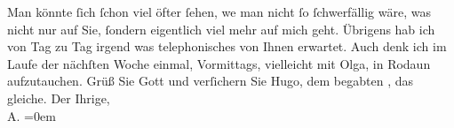 \begin{ledgroupsized}[t]{13cm}
           \pstart
           Man könnte ſich ſchon viel öfter ſehen, we{\geminationn} man nicht ſo
               ſchwerfällig wäre, was nicht {\pb}nur auf Sie, ſondern
               eigentlich viel mehr auf mich geht. Übrigens hab ich von Tag zu Tag irgend was
               telephonisches von Ihnen erwartet. Auch denk ich im Laufe der nächſten Woche einmal,
                  Vormittags, vielleicht mit Olga,
               in Rodaun aufzutauchen.\pend
           \pstart
           Grüß Sie Gott und verſichern {\pb}Sie Hugo, dem begabten \label{K_L01280_2v}\label{K_L01280_2h}, das gleiche.\pend
           \pstart
           Der Ihrige,{\\[\baselineskip]}\spacefill\mbox{A.}\pend
           \leftskip=0em{}
         
         \endnumbering{}\end{ledgroupsized}  \newcommand{\dateiname}{L01280}\newcommand{\titel}{Arthur Schnitzler an Richard Beer-Hofmann, 27. 3. 1903}\newcommand{\editorInnen}{Martin Anton Müller und Gerd-Hermann Susen}
      